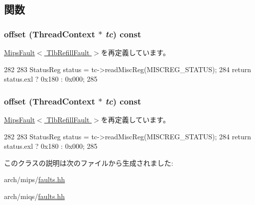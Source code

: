 \subsection{関数}
\hypertarget{classMipsISA_1_1TlbRefillFault_a9c059b781f653170e9da1d520c6d96b1}{
\subsubsection[{offset}]{ offset ({\bf ThreadContext} $\ast$ {\em tc}) const}}
\label{classMipsISA_1_1TlbRefillFault_a9c059b781f653170e9da1d520c6d96b1}


\hyperlink{classMipsISA_1_1MipsFault_a9c059b781f653170e9da1d520c6d96b1}{MipsFault$<$ TlbRefillFault $>$}を再定義しています。


\begin{DoxyCode}
282     {
283         StatusReg status = tc->readMiscReg(MISCREG_STATUS);
284         return status.exl ? 0x180 : 0x000;
285     }
\end{DoxyCode}
\hypertarget{classMipsISA_1_1TlbRefillFault_a9c059b781f653170e9da1d520c6d96b1}{
\subsubsection[{offset}]{ offset ({\bf ThreadContext} $\ast$ {\em tc}) const}}
\label{classMipsISA_1_1TlbRefillFault_a9c059b781f653170e9da1d520c6d96b1}


\hyperlink{classMipsISA_1_1MipsFault_a9c059b781f653170e9da1d520c6d96b1}{MipsFault$<$ TlbRefillFault $>$}を再定義しています。


\begin{DoxyCode}
282     {
283         StatusReg status = tc->readMiscReg(MISCREG_STATUS);
284         return status.exl ? 0x180 : 0x000;
285     }
\end{DoxyCode}


このクラスの説明は次のファイルから生成されました:\begin{DoxyCompactItemize}
\item 
arch/mips/\hyperlink{arch_2mips_2faults_8hh}{faults.hh}\item 
arch/miqs/\hyperlink{arch_2miqs_2faults_8hh}{faults.hh}\end{DoxyCompactItemize}
